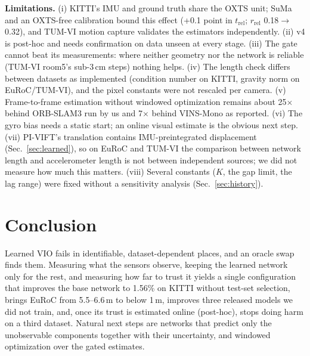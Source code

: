 \documentclass[letterpaper,journal]{IEEEtran}
\begin{document}
\textbf{Limitations.} (i) KITTI's IMU and ground truth share the OXTS unit; SuMa and an OXTS-free calibration bound this effect (+0.1 point in $t_\mathrm{rel}$; $r_\mathrm{rel}$ 0.18$\to$0.32), and TUM-VI motion capture validates the estimators independently. (ii) v4 is post-hoc and needs confirmation on data unseen at every stage. (iii) The gate cannot beat its measurements: where neither geometry nor the network is reliable (TUM-VI room5's sub-3\,cm steps) nothing helps. (iv) The length check differs between datasets as implemented (condition number on KITTI, gravity norm on EuRoC/TUM-VI), and the pixel constants were not rescaled per camera. (v) Frame-to-frame estimation without windowed optimization remains about 25$\times$ behind ORB-SLAM3 run by us and 7$\times$ behind VINS-Mono as reported. (vi) The gyro bias needs a static start; an online visual estimate is the obvious next step. (vii) PI-VIFT's translation contains IMU-preintegrated displacement (Sec.~\ref{sec:learned}), so on EuRoC and TUM-VI the comparison between network length and accelerometer length is not between independent sources; we did not measure how much this matters. (viii) Several constants ($K$, the gap limit, the lag range) were fixed without a sensitivity analysis (Sec.~\ref{sec:history}).

\section{Conclusion}

Learned VIO fails in identifiable, dataset-dependent places, and an oracle swap finds them. Measuring what the sensors observe, keeping the learned network only for the rest, and measuring how far to trust it yields a single configuration that improves the base network to 1.56\% on KITTI without test-set selection, brings EuRoC from 5.5--6.6\,m to below 1\,m, improves three released models we did not train, and, once its trust is estimated online (post-hoc), stops doing harm on a third dataset. Natural next steps are networks that predict only the unobservable components together with their uncertainty, and windowed optimization over the gated estimates.



\end{document}

